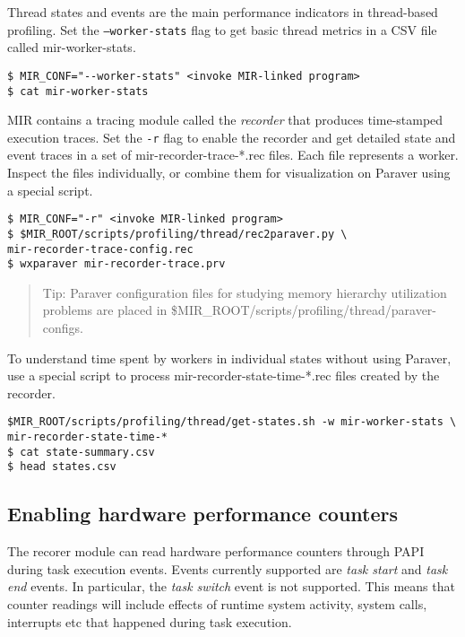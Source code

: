 \documentclass[11pt,a4paper]{article}
\begin{document}
Thread states and events are the main performance indicators in thread-based profiling.
Set the \texttt{--worker-stats} flag to get basic thread metrics in a CSV file called \textsf{mir-worker-stats}.

\begin{lstlisting}[style=MyInputStyle]
$ MIR_CONF="--worker-stats" <invoke MIR-linked program>
$ cat mir-worker-stats
\end{lstlisting}

MIR contains a tracing module called the \textit{recorder} that produces time-stamped execution traces. Set the \texttt{-r} flag to enable the recorder and get detailed state and event traces in a set of \textsf{mir-recorder-trace-*.rec} files.  Each file represents a worker. Inspect the files individually, or combine them for visualization on Paraver using a special script.

\begin{lstlisting}[style=MyInputStyle]
$ MIR_CONF="-r" <invoke MIR-linked program>
$ $MIR_ROOT/scripts/profiling/thread/rec2paraver.py \
mir-recorder-trace-config.rec
$ wxparaver mir-recorder-trace.prv
\end{lstlisting}

\begin{framed}
\begin{quote}
Tip: Paraver configuration files for studying memory hierarchy utilization problems are placed in \textsf{\$MIR\_ROOT/scripts/profiling/thread/paraver-configs}.
\end{quote}
\end{framed}

To understand time spent by workers in individual states without using Paraver, use a special script to process \textsf{mir-recorder-state-time-*.rec} files created by the recorder.

\begin{lstlisting}[style=MyInputStyle]
$MIR_ROOT/scripts/profiling/thread/get-states.sh -w mir-worker-stats \
mir-recorder-state-time-*
$ cat state-summary.csv
$ head states.csv
\end{lstlisting}

\subsection{Enabling hardware performance counters}\label{sec:enabling-hardware-performance-counters}

The recorer module can read hardware performance counters through PAPI during task execution events. Events currently supported are \textit{task start} and \textit{task end} events.
In particular, the \textit{task switch} event is not supported.
This means that counter readings will include effects of runtime system activity, system calls, interrupts etc that happened during task execution.
\end{document}
